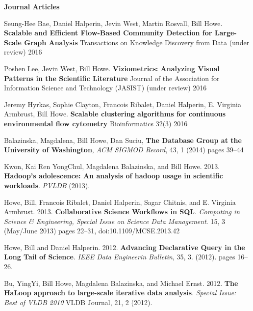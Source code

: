 {\bf Journal Articles}
\begin{bulletlist}

\item Seung-Hee Bae, Daniel Halperin, Jevin West, Martin Rosvall, Bill Howe. 
\textbf{Scalable and Efficient Flow-Based Community Detection for Large-Scale Graph Analysis}
Transactions on Knowledge Discovery from Data (under review) 2016

\item Poshen Lee, Jevin West, Bill Howe. 
\textbf{Viziometrics: Analyzing Visual Patterns in the Scientific Literature}
Journal of the Association for Information Science and Technology (JASIST) (under review) 2016

\item Jeremy Hyrkas, Sophie Clayton, Francois Ribalet, Daniel Halperin, E. Virginia Armbrust, Bill Howe. 
\textbf{Scalable clustering algorithms for continuous environmental flow cytometry}
Bioinformatics 32(3) 2016

\item Balazinska, Magdalena, Bill Howe, Dan Suciu,
\textbf{The Database Group at the University of Washington},
\emph{ACM SIGMOD Record}, 43, 1 (2014) pages 39--44

\item Kwon, Kai Ren YongChul, Magdalena Balazinska, and Bill Howe. 2013. \textbf{Hadoop's
adolescence: An analysis of hadoop usage in scientific workloads}.
\emph{PVLDB} (2013). 

\item Howe, Bill, Francois Ribalet, Daniel
Halperin, Sagar Chitnis, and E. Virginia Armbrust. 2013. \textbf{Collaborative
Science Workflows in SQL}. \emph{Computing in Science \& Engineering,
Special Issue on Science Data Management}. 15, 3 (May/June 2013) pages 22--31, 
doi:10.1109/MCSE.2013.42


\item Howe, Bill and Daniel Halperin. 2012. 
\textbf{Advancing Declarative Query in the Long Tail of Science}. 
\emph{IEEE Data Engineerin Bulletin},
35, 3. (2012). pages 16--26.

\item Bu, YingYi, Bill Howe, Magdalena Balazinska, and Michael
Ernst. 2012. \textbf{The HaLoop approach to large-scale iterative data analysis}.
\emph{Special Issue: Best of VLDB 2010} VLDB Journal, 21, 2 (2012).


\end{bulletlist}
